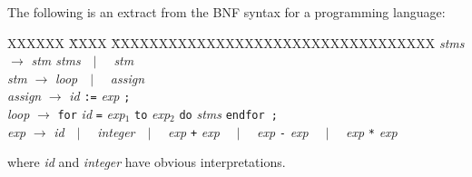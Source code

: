 

\question

\newenvironment{bnf}{
    \begin{tabbing}
    XXXXXX \= XXXX \= XXXXXXXXXXXXXXXXXXXXXXXXXXXXXXXXXX\kill}{
    \end{tabbing}
    }

\newcommand{\nt}[1]{{\it #1\/}}
\newcommand{\Or}[1]{\ \ $|$ \ \ #1}
\newcommand{\Rule}[2]{{\it #1} \> $\rightarrow$ \> #2}


The following is an extract from the BNF syntax for
a programming language:
\begin{bnf}
\Rule{\nt{stms}}{\nt{stm stms}\Or{\nt{stm}}} \\
\Rule{\nt{stm}}{\nt{loop}\Or{\nt{assign}}} \\
\Rule{\nt{assign}}{\nt{id} \verb":=" \nt{exp} \verb";"} \\
\Rule{\nt{loop}}{\verb"for" \nt{id} \verb"=" \nt{exp$_1$} \verb"to" \nt{exp$_2$}
 \verb"do" \nt{stms} \verb"endfor ;"} \\
\Rule{\nt{exp}}{\nt{id}\Or{\nt{integer}}\Or{\nt{exp} \verb"+" \nt{exp}}
        \Or{\nt{exp} \verb"-" \nt{exp}} \Or{\nt{exp} \verb"*" \nt{exp}}}
\end{bnf}
where \nt{id} and \nt{integer} have obvious interpretations.
